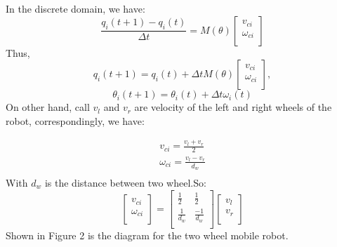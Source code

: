 \documentclass[times]{asjcauth}
\begin{document}
In the discrete domain, we have: 
\begin{equation}
	\frac{q_{i}(t+1)-q_{i}(t)}{\Delta{t}}=
	{M}(\theta)\left[
		\begin{array}{c}
			v_{ci}\\
			\omega_{ci}\\
		\end{array}
	\right]
\end{equation}
Thus, 
\begin{equation}
	q_{i}(t+1)=q_{i}(t)+\Delta{t}M(\theta)\left[
		\begin{array}{c}
			v_{ci}\\
			\omega_{ci}\\
		\end{array}
		\right],
\end{equation}
\begin{equation}
\theta_{i}(t+1)=\theta_{i}(t)+\Delta{t}\omega_{i}(t)
\end{equation}
On other hand, call $v_{l}$ and $v_r$ are velocity of the left and right wheels of the robot, correspondingly, we have: 

\begin{equation}
	\begin{split}
		v_{ci}=\frac{v_l+v_r}{2} \\
		\omega_{ci}=\frac{v_l-v_r}{d_{w}}\\ 
	\end{split}
\end{equation}
With $d_{w}$ is the distance between two wheel.So: 
\begin{equation}
\left[
	\begin{array}{c}
		v_{ci}\\
		\omega_{ci}\\
	\end{array}
\right]=
\left[
	\begin{array}{cc}
		\frac{1}{2}&\frac{1}{2}\\
		\frac{1}{d_{w}}&\frac{-1}{d_{w}}\\
	\end{array}
\right]
\left[
	\begin{array}{c}
		v_l\\
		v_r\\
	\end{array}
\right]
\end{equation}
Shown in Figure 2 is the diagram for the two wheel mobile robot.
\end{document}
